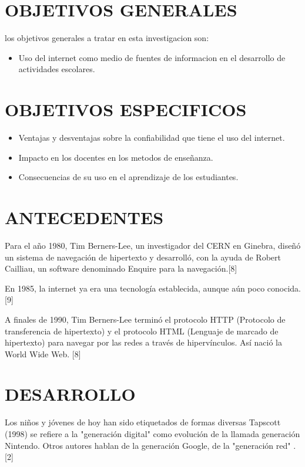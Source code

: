 \documentclass{bmcart}
\begin{document}
\section*{OBJETIVOS GENERALES}
los objetivos generales a tratar en esta investigacion son:
\begin{itemize}
	\item Uso del internet como medio de fuentes de informacion en el desarrollo de actividades escolares.
	
	
\end{itemize}
\newpage
\section*{OBJETIVOS ESPECIFICOS}
\begin{itemize}
\item Ventajas y desventajas sobre la confiabilidad que tiene el uso del internet.
\item Impacto en los docentes en los metodos de enseñanza.
\item Consecuencias de su uso en el aprendizaje de los estudiantes.

\end{itemize}


\section*{ANTECEDENTES}
Para el año 1980, Tim Berners-Lee, un investigador del CERN en Ginebra, diseñó un sistema de navegación de hipertexto y desarrolló, con la ayuda de Robert Cailliau, un software denominado Enquire para la navegación.[8]

En 1985, la internet ya era una tecnología establecida, aunque aún poco conocida. [9]

A finales de 1990, Tim Berners-Lee terminó el protocolo HTTP (Protocolo de transferencia de hipertexto) y el protocolo HTML (Lenguaje de marcado de hipertexto) para navegar por las redes a través de hipervínculos. Así nació la World Wide Web. [8]


\section*{DESARROLLO}
Los niños y jóvenes de hoy han sido etiquetados de formas diversas
Tapscott (1998) se refiere a la "generación digital" como evolución de la llamada generación Nintendo. Otros autores hablan de la generación Google, de la "generación red" .[2]\\
\end{document}
